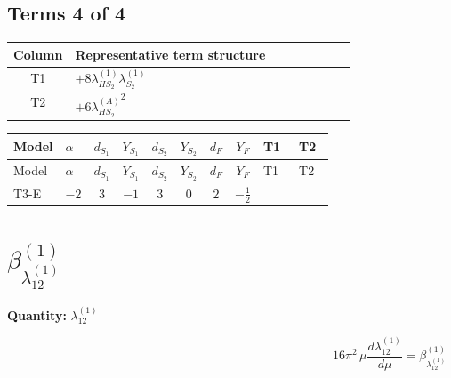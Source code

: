 \documentclass[8pt]{article}
\begin{document}
\begin{landscape}
\subsection*{Terms 4 of 4}
\begin{center}
\begin{tabular}{@{}c >{\raggedright\arraybackslash}p{0.82\linewidth}@{}}
\toprule
Column & Representative term structure \\
\midrule
T1 & \(\displaystyle +8 {\lambda_{HS_2}^{(1)}} {\lambda_{S_2}^{(1)}}\) \\
\midrule
T2 & \(\displaystyle +6 {\lambda_{HS_2}^{(A)}}^2\) \\
\midrule
\bottomrule
\end{tabular}
\end{center}
\smallskip
\tiny
\begin{longtable}{@{}llcccccc >{\raggedright\arraybackslash}p{0.21\linewidth} >{\raggedright\arraybackslash}p{0.21\linewidth}@{}}
\toprule
Model & $\alpha$ & $d_{S_1}$ & $Y_{S_1}$ & $d_{S_2}$ & $Y_{S_2}$ & $d_F$ & $Y_F$ & T1 & T2 \\
\midrule
\endfirsthead
\toprule
Model & $\alpha$ & $d_{S_1}$ & $Y_{S_1}$ & $d_{S_2}$ & $Y_{S_2}$ & $d_F$ & $Y_F$ & T1 & T2 \\
\midrule
\endhead
T3-E & $-2$ & $3$ & $-1$ & $3$ & $0$ & $2$ & $-\frac{1}{2}$ & \scriptsize\adjustbox{max width=\linewidth}{$\begin{gathered} +8 {\lambda_{HS_2}^{(1)}} {\lambda_{S_2}^{(1)}}\end{gathered}$} & \scriptsize\adjustbox{max width=\linewidth}{$\begin{gathered} +6 {\lambda_{HS_2}^{(A)}}^2\end{gathered}$} \\
\midrule
\bottomrule
\end{longtable}
\clearpage
\section*{$\beta_{\lambda_{12}^{(1)}}^{(1)}$}
\noindent\textbf{Quantity: }$\lambda_{12}^{(1)}$\par\smallskip
\[16\pi^2\,\mu\frac{d \lambda_{12}^{(1)}}{d\mu}=\beta_{\lambda_{12}^{(1)}}^{(1)}\]

\end{landscape}
\end{document}
